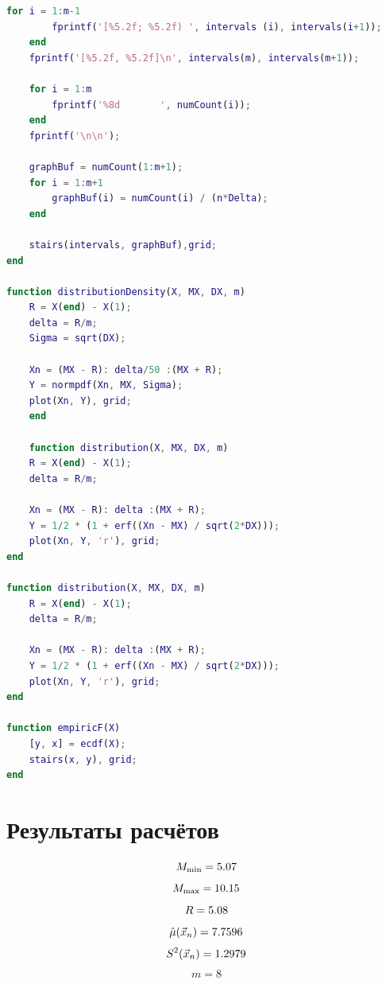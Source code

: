 \documentclass[12pt]{report}
\begin{document}
\begin{lstlisting}[language=Matlab]
	for i = 1:m-1
		fprintf('[%5.2f; %5.2f) ', intervals (i), intervals(i+1));
	end 
	fprintf('[%5.2f, %5.2f]\n', intervals(m), intervals(m+1));
	
	for i = 1:m 
		fprintf('%8d       ', numCount(i));
	end
	fprintf('\n\n');
	
	graphBuf = numCount(1:m+1);
	for i = 1:m+1
		graphBuf(i) = numCount(i) / (n*Delta); 
	end

	stairs(intervals, graphBuf),grid;
end

function distributionDensity(X, MX, DX, m)
	R = X(end) - X(1);
	delta = R/m;
	Sigma = sqrt(DX);
	
	Xn = (MX - R): delta/50 :(MX + R);
	Y = normpdf(Xn, MX, Sigma);
	plot(Xn, Y), grid;
	end
	
	function distribution(X, MX, DX, m)
	R = X(end) - X(1);
	delta = R/m;
	
	Xn = (MX - R): delta :(MX + R);
	Y = 1/2 * (1 + erf((Xn - MX) / sqrt(2*DX))); 
	plot(Xn, Y, 'r'), grid;
end

function distribution(X, MX, DX, m)
	R = X(end) - X(1);
	delta = R/m;

	Xn = (MX - R): delta :(MX + R);
	Y = 1/2 * (1 + erf((Xn - MX) / sqrt(2*DX))); 
	plot(Xn, Y, 'r'), grid;
end

function empiricF(X)  
	[y, x] = ecdf(X);
	stairs(x, y), grid;
end

\end{lstlisting}

\section*{Результаты расчётов}

\begin{equation*}
M_{\min} = 5.07 \\
\end{equation*}
\begin{equation*}
M_{\max} = 10.15 \\
\end{equation*}
\begin{equation*}
R = 5.08 \\
\end{equation*}
\begin{equation*}
\hat\mu(\vec x_n) = 7.7596 \\
\end{equation*}
\begin{equation*}
S^2(\vec x_n) = 1.2979 \\
\end{equation*}
\begin{equation*}
m = 8
\end{equation*}
\end{document}
